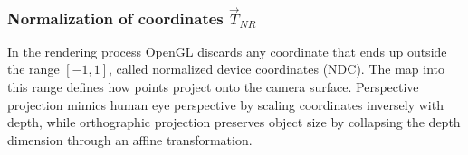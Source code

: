\subsubsection{Normalization of coordinates \texorpdfstring{$\vec{T}_{NR}$}{T\_NR}}


% 


%


In the rendering process OpenGL discards any coordinate that ends up outside the range $[-1,1]$, called normalized device coordinates (NDC). The map into this range defines how points project onto the camera surface. Perspective projection mimics human eye perspective by scaling coordinates inversely with depth, while orthographic projection preserves object size by collapsing the depth dimension through an affine transformation. %

%
%

